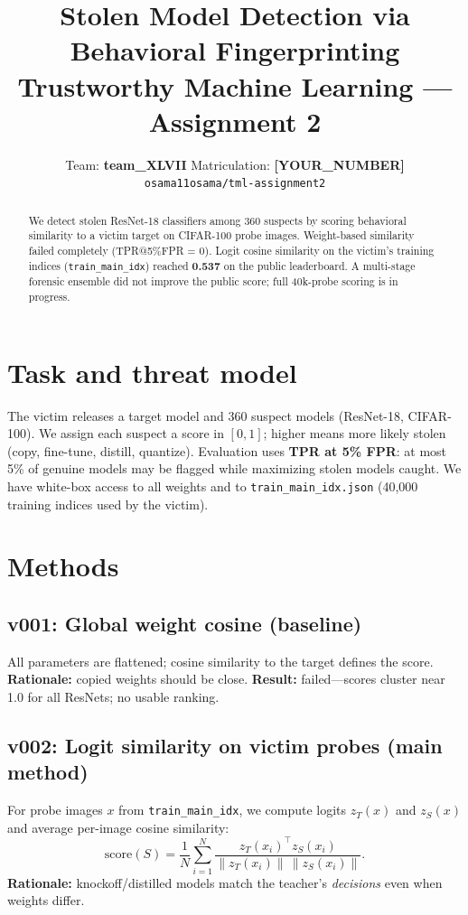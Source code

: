 \documentclass[10pt,twocolumn]{article}
\title{\textbf{Stolen Model Detection via Behavioral Fingerprinting}\\
\large Trustworthy Machine Learning --- Assignment 2}
\author{
  Team: \textbf{team\_XLVII} \quad
  Matriculation: \textbf{[YOUR\_NUMBER]} \\
  \texttt{osama11osama/tml-assignment2}
}
\date{}
\begin{document}
\maketitle

\begin{abstract}
We detect stolen ResNet-18 classifiers among 360 suspects by scoring behavioral similarity to a victim target on CIFAR-100 probe images.
Weight-based similarity failed completely (TPR@5\%FPR = 0).
Logit cosine similarity on the victim's training indices (\texttt{train\_main\_idx}) reached \textbf{0.537} on the public leaderboard.
A multi-stage forensic ensemble did not improve the public score; full 40k-probe scoring is in progress.
\end{abstract}

\section{Task and threat model}
The victim releases a target model and 360 suspect models (ResNet-18, CIFAR-100).
We assign each suspect a score in $[0,1]$; higher means more likely stolen (copy, fine-tune, distill, quantize).
Evaluation uses \textbf{TPR at 5\% FPR}: at most 5\% of genuine models may be flagged while maximizing stolen models caught.
We have white-box access to all weights and to \texttt{train\_main\_idx.json} (40{,}000 training indices used by the victim).

\section{Methods}
\subsection{v001: Global weight cosine (baseline)}
All parameters are flattened; cosine similarity to the target defines the score.
\textbf{Rationale:} copied weights should be close.
\textbf{Result:} failed---scores cluster near 1.0 for all ResNets; no usable ranking.

\subsection{v002: Logit similarity on victim probes (main method)}
For probe images $x$ from \texttt{train\_main\_idx}, we compute logits $z_T(x)$ and $z_S(x)$ and average per-image cosine similarity:
\begin{equation}
  \mathrm{score}(S) = \frac{1}{N}\sum_{i=1}^{N}
  \frac{z_T(x_i)^\top z_S(x_i)}{\|z_T(x_i)\|\,\|z_S(x_i)\|}.
\end{equation}
\textbf{Rationale:} knockoff/distilled models match the teacher's \emph{decisions} even when weights differ.
\end{document}
